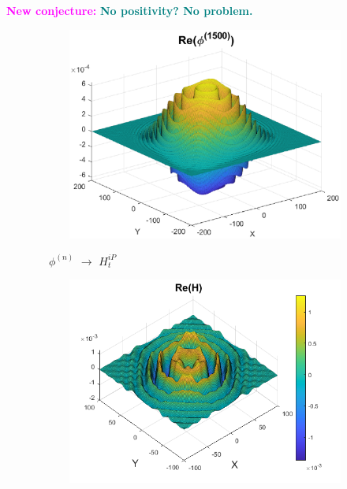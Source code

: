 \documentclass{beamer}
\theoremstyle{definition}
\begin{document}
\begin{frame}
\pause

\textbf{\textcolor{magenta}{New conjecture:}} \textcolor{teal}{\textbf{No positivity? No problem.}}

\begin{figure}
	\vspace{-10pt}
	\begin{subfigure}{0.35\textwidth}
		\centering
		\includegraphics[width=\textwidth]{Real_1500.eps}
	\end{subfigure}
$\quad$$\phi^{(n)}$ $\to$ $H^{iP}_t$$\quad$
	\begin{subfigure}{0.35\textwidth}
		\centering
		\includegraphics[width=\textwidth, trim={0 0 2.5cm 0},clip]{H_ex0.png}
	\end{subfigure}
\end{figure}
\end{frame}
\end{document}
